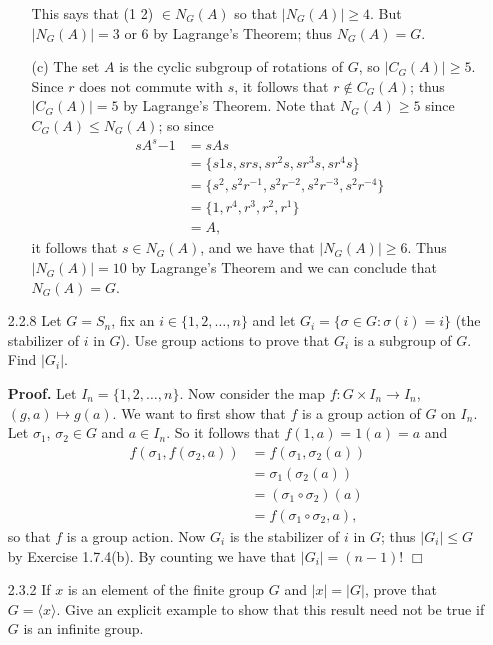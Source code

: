 \documentclass[9pt]{article}
\newcommand{\qed}{\hfill \ensuremath{\Box}}
\newcommand{\cyc}[1]{\langle #1 \rangle}
\begin{document}
\begin{enumerate}
\begin{enumerate}
               This says that (1 2) $\in N_G(A)$ so that $|N_G(A)| \ge 4$. But
               $|N_G(A)| = 3$ or 6 by Lagrange's Theorem; thus $N_G(A) = G$.
         \item[(c)]
               The set $A$ is the cyclic subgroup of rotations of $G$, so
               $|C_G(A)| \ge 5$. Since $r$ does not commute with $s$, it follows
               that $r \notin C_G(A)$; thus $|C_G(A)| = 5$ by Lagrange's
               Theorem. Note that $N_G(A) \ge 5$ since $C_G(A) \le N_G(A)$; so
               since
               \begin{align*}
                  sA^s{-1} &= sAs \\
                     &= \{s1s, srs, sr^2s, sr^3s, sr^4s\} \\
                     &= \{s^2, s^2r^{-1}, s^2r^{-2}, s^2r^{-3}, s^2r^{-4}\} \\
                     &= \{1, r^4, r^3, r^2, r^1\} \\
                     &= A,
               \end{align*}
               it follows that $s \in N_G(A)$, and we have that
               $|N_G(A)| \ge 6$. Thus $|N_G(A)| = 10$ by Lagrange's Theorem and
               we can conclude that $N_G(A) = G$.
      \end{enumerate}
   \item[2.2.8]   Let $G = S_n$, fix an $i \in \{1, 2, \ldots, n\}$ and let
                  $G_i = \{\sigma \in G : \sigma(i) = i\}$ (the stabilizer of
                  $i$ in $G$). Use group actions to prove that $G_i$ is a
                  subgroup of $G$. Find $|G_i|$.

      \textbf{Proof.} Let $I_n = \{1, 2, \ldots, n\}$. Now consider the map 
      $f: G \times I_n \rightarrow I_n$, $(g, a) \mapsto g(a)$. We want to first
      show that $f$ is a group action of $G$ on $I_n$. Let $\sigma_1$,
      $\sigma_2 \in G$ and $a \in I_n$. So it follows that $f(1, a) = 1(a) = a$
      and
      \begin{align*}
         f(\sigma_1, f(\sigma_2, a)) &= f(\sigma_1, \sigma_2(a)) \\
            &= \sigma_1(\sigma_2(a)) \\
            &= (\sigma_1 \circ \sigma_2)(a) \\
            &= f(\sigma_1 \circ \sigma_2, a),
      \end{align*}
      so that $f$ is a group action. Now $G_i$ is the stabilizer of $i$ in $G$;
      thus $|G_i| \le G$ by Exercise 1.7.4(b). By counting we have that
      $|G_i| = (n - 1)!$ \qed
   \item[2.3.2]   If $x$ is an element of the finite group $G$ and $|x| = |G|$,
                  prove that $G = \cyc{x}$. Give an explicit example to show 
                  that this result need not be true if $G$ is an infinite group.
                  

\end{enumerate}
\end{document}
